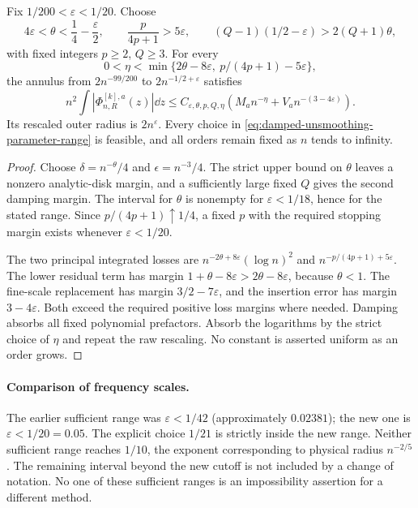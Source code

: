 \begin{proposition}
\label{prop:damped-unsmoothing-band-range}
Fix $1/200<\varepsilon<1/20$. Choose
\begin{equation}\label{eq:damped-unsmoothing-parameter-range}
 4\varepsilon<\theta<\frac14-\frac\varepsilon2,
 \qquad \frac{p}{4p+1}>5\varepsilon,
 \qquad (Q-1)(1/2-\varepsilon)>2(Q+1)\theta,
\end{equation}
with fixed integers $p\ge2$, $Q\ge3$. For every
\[
 0<\eta<\min\{2\theta-8\varepsilon,\ p/(4p+1)-5\varepsilon\},
\]
the annulus from $2n^{-99/200}$ to $2n^{-1/2+\varepsilon}$ satisfies
\begin{equation}\label{eq:damped-unsmoothing-general-band}
 n^2\int |\Phi^{[k],a}_{n,R}(z)|\dd z
       \le C_{\varepsilon,\theta,p,Q,\eta}
                    \left(M_an^{-\eta}+V_an^{-(3-4\varepsilon)}\right).
\end{equation}
Its rescaled outer radius is $2n^\varepsilon$. Every choice in
\eqref{eq:damped-unsmoothing-parameter-range} is feasible, and all
orders remain fixed as $n$ tends to infinity.
\end{proposition}
\begin{proof}
Choose $\delta=n^{-\theta}/4$ and $\epsilon=n^{-3}/4$.
The strict upper bound on $\theta$ leaves a nonzero analytic-disk
margin, and a sufficiently large fixed $Q$ gives the second damping
margin. The interval for $\theta$ is nonempty for
$\varepsilon<1/18$, hence for the stated range. Since
$p/(4p+1)\uparrow1/4$, a fixed $p$ with the required stopping margin
exists whenever $\varepsilon<1/20$.

The two principal integrated losses are
$n^{-2\theta+8\varepsilon}(\log n)^2$ and
$n^{-p/(4p+1)+5\varepsilon}$. The lower residual term has margin
$1+\theta-8\varepsilon>2\theta-8\varepsilon$, because
$\theta<1$. The fine-scale replacement has margin
$3/2-7\varepsilon$, and the insertion error has margin
$3-4\varepsilon$. Both exceed the required positive loss margins
where needed. Damping absorbs all fixed polynomial prefactors.
Absorb the logarithms by the strict choice of $\eta$ and repeat the
raw rescaling. No constant is asserted uniform as an order grows.
\end{proof}

\paragraph{Comparison of frequency scales.}
The earlier sufficient range was $\varepsilon<1/42$ (approximately
$0.02381$); the new one is $\varepsilon<1/20=0.05$.
The explicit choice $1/21$ is strictly inside the new range.
Neither sufficient range reaches $1/10$, the exponent corresponding
to physical radius $n^{-2/5}$. The remaining interval beyond the new
cutoff is not included by a change of notation. No one of these
sufficient ranges is an impossibility assertion for a different method.

